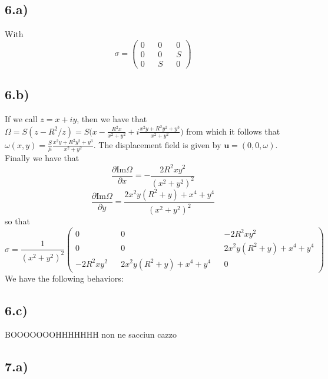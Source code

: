 \documentclass[10pt,a4paper]{book}
\begin{document}
\subsection*{6.a)}
With $$\sigma=\begin{pmatrix}
0 && 0 && 0\\
0 && 0 && S\\
0 && S && 0
\end{pmatrix}$$

\subsection*{6.b)}
If we call $z=x+iy$, then we have that $\Omega=S(z-R^2/z)=S\bigg(x-\frac{R^2x}{x^2+y^2}+i\frac{x^2y+R^2y^2+y^3}{x^2+y^2}\bigg)$ from which it follows that $\omega(x,y)=\frac{S}{\mu}\frac{x^2y+R^2y^2+y^3}{x^2+y^2}$. The displacement field is given by $\mathbf{u}=(0,0,\omega)$. Finally we have that 
$$\frac{\partial\text{Im}\Omega}{\partial x}=-\frac{2R^2xy^2}{(x^2+y^2)^2}$$
$$\frac{\partial\text{Im}\Omega}{\partial y}=\frac{2x^2y(R^2+y)+x^4+y^4}{(x^2+y^2)^2}$$
so that 
$$\sigma=
\frac{1}{(x^2+y^2)^2}
\begin{pmatrix}
0 && 0 && -2R^2xy^2\\
0 && 0 && 2x^2y(R^2+y)+x^4+y^4\\
-2R^2xy^2 && 2x^2y(R^2+y)+x^4+y^4 && 0
\end{pmatrix}
$$
We have the following behaviors:


\subsection*{6.c)}
BOOOOOOOHHHHHHH non ne sacciun cazzo


\subsection*{7.a)}
\end{document}

